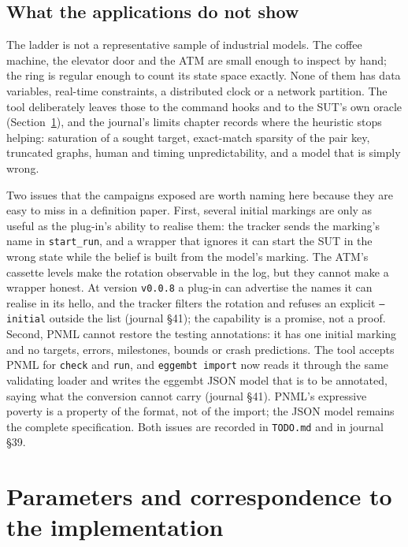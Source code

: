 \documentclass[11pt,a4paper]{article}
\begin{document}
\subsection{What the applications do not show}

The ladder is not a representative sample of industrial models.  The coffee
machine, the elevator door and the ATM are small enough to inspect by hand;
the ring is regular enough to count its state space exactly.  None of them has
data variables, real-time constraints, a distributed clock or a network
partition.  The tool deliberately leaves those to the command hooks and to the
SUT's own oracle (Section~\ref{sec:implementation}), and the journal's limits
chapter records where the heuristic stops helping: saturation of a sought
target, exact-match sparsity of the pair key, truncated graphs, human and
timing unpredictability, and a model that is simply wrong.

Two issues that the campaigns exposed are worth naming here because they are
easy to miss in a definition paper.  First, several initial markings are only
as useful as the plug-in's ability to realise them: the tracker sends the
marking's name in \texttt{start\_run}, and a wrapper that ignores it can start
the SUT in the wrong state while the belief is built from the model's marking.
The ATM's cassette levels make the rotation observable in the log, but they
cannot make a wrapper honest.  At version \texttt{v0.0.8} a plug-in can
advertise the names it can realise in its hello, and the tracker filters the
rotation and refuses an explicit \texttt{--initial} outside the list (journal
\S41); the capability is a promise, not a proof.  Second, PNML cannot restore
the testing annotations: it has one initial marking and no targets, errors,
milestones, bounds or crash predictions.  The tool accepts PNML for
\texttt{check} and \texttt{run}, and \texttt{eggembt import} now reads it
through the same validating loader and writes the eggembt JSON model that is
to be annotated, saying what the conversion cannot carry (journal \S41).
PNML's expressive poverty is a property of the format, not of the import; the
JSON model remains the complete specification.  Both issues are recorded in
\texttt{TODO.md} and in journal \S39.

\section{Parameters and correspondence to the implementation}\label{sec:implementation}
\end{document}
